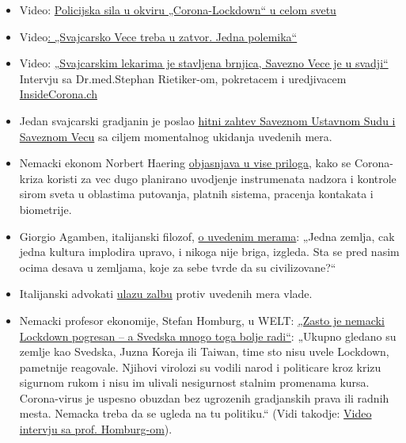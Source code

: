 \begin{itemize}
\tightlist
\item
  Video: \href{https://www.youtube.com/watch?v=ZphK_CMUbKg}{Policijska
  sila u okviru „Corona-Lockdown`` u celom svetu}
\item
  Video\href{https://www.youtube.com/watch?v=SO2JMkKtq40}{: „Svajcarsko
  Vece treba u zatvor. Jedna polemika``}
\item
  Video: \href{https://www.youtube.com/watch?v=eU6IdglI-wc}{„Svajcarskim
  lekarima je stavljena brnjica, Savezno Vece je u svadji``}~ Intervju
  sa Dr.med.Stephan Rietiker-om, pokretacem i uredjivacem
  \href{https://www.insidecorona.ch/}{InsideCorona.ch}
\item
  Jedan svajcarski gradjanin je poslao
  \href{https://faktenb-covid-19-massnahmen.jimdofree.com/}{hitni zahtev
  Saveznom Ustavnom Sudu i Saveznom Vecu} sa ciljem momentalnog ukidanja
  uvedenih mera.
\item
  Nemacki ekonom Norbert Haering
  \href{https://norberthaering.de/}{objasnjava u vise priloga,} kako se
  Corona-kriza koristi za vec dugo planirano uvodjenje instrumenata
  nadzora i kontrole sirom sveta u oblastima putovanja, platnih sistema,
  pracenja kontakata i biometrije.
\item
  Giorgio Agamben, italijanski filozof,
  \href{https://www.nzz.ch/feuilleton/coronavirus-giorgio-agamben-zum-zusammenbruch-der-demokratie-ld.1551896}{o
  uvedenim merama}: „Jedna zemlja, cak jedna kultura implodira upravo, i
  nikoga nije briga, izgleda. Sta se pred nasim ocima desava u zemljama,
  koje za sebe tvrde da su civilizovane?``
\item
  Italijanski advokati
  \href{https://www.tvprato.it/2020/04/la-camera-civile-degli-avvocati-pratesi-chiede-lannullamento-del-dpcm-del-10-aprile-e-illegittimo/}{ulazu
  zalbu} protiv uvedenih mera vlade.
\item
  Nemacki profesor ekonomije, Stefan Homburg, u WELT:
  \href{https://www.msn.com/de-de/nachrichten/coronavirus/warum-deutschlands-lockdown-falsch-ist-–-und-schweden-vieles-besser-macht/ar-BB12E6km}{„Zasto
  je nemacki Lockdown pogresan -- a Svedska mnogo toga bolje radi``}:
  „Ukupno gledano su zemlje kao Svedska, Juzna Koreja ili Taiwan, time
  sto nisu uvele Lockdown, pametnije reagovale. Njihovi virolozi su
  vodili narod i politicare kroz krizu sigurnom rukom i nisu im ulivali
  nesigurnost stalnim promenama kursa. Corona-virus je uspesno obuzdan
  bez ugrozenih gradjanskih prava ili radnih mesta. Nemacka treba da se
  ugleda na tu politiku.`` (Vidi takodje:
  \href{https://www.youtube.com/watch?v=Vy-VuSRoNPQ}{Video intervju sa
  prof. Homburg-om}).
\end{itemize}

